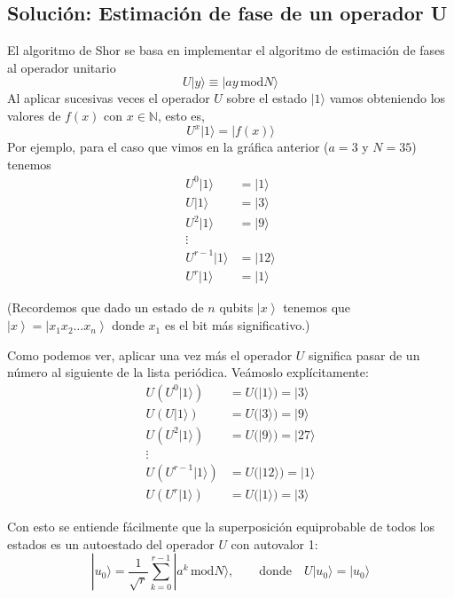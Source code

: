 \documentclass[a4paper,11pt]{book} %
\numberwithin{equation}{chapter}
\begin{document}
\subsection{Solución: Estimación de fase de un operador U}

El algoritmo de Shor se basa en implementar el algoritmo de estimación de fases al operador unitario
	\begin{equation}
	U |y \rangle \equiv | ay \, \text{mod} N \rangle
	\end{equation}
Al aplicar sucesivas veces el operador $U$ sobre el estado $|1 \rangle$ vamos obteniendo los valores de $f(x)$ con $x \in \mathbb{N}$, esto es,
	\begin{equation}
	U^x |1 \rangle = | f(x) \rangle
	\end{equation}
Por ejemplo, para el caso que vimos en la gráfica anterior ($a=3$ y $N=35$) tenemos
\begin{align*}
U^0 |1\rangle & = |1\rangle \\
U |1\rangle & = |3\rangle \\
U^2 |1\rangle & = |9\rangle \\
\vdots \\
U^{r-1} |1\rangle & = |12\rangle \\
U^r |1\rangle & = |1\rangle
\end{align*}

(Recordemos que dado un estado de $n$ qubits $\left| x \right\rangle$ tenemos que $\left| x \right\rangle = \left| x_1 x_2 \dots x_n \right\rangle$ donde $x_1$ es el bit más significativo.)

Como podemos ver, aplicar una vez más el operador $U$ significa pasar de un número al siguiente de la lista periódica. Veámoslo explícitamente:
\begin{align*}
U(U^0 |1\rangle) & = U(|1\rangle) = |3\rangle \\
U(U |1\rangle) & = U(|3\rangle) = |9\rangle \\
U(U^2 |1\rangle) & = U(|9\rangle) = |27\rangle\\
\vdots \\
U(U^{r-1} |1\rangle) & = U(|12\rangle) =|1\rangle \\
U(U^r |1\rangle) & = U(|1\rangle) = |3\rangle
\end{align*}

Con esto se entiende fácilmente que la superposición equiprobable de todos los estados es un autoestado del operador $U$ con autovalor 1:
	\begin{equation}
	| u_0 \rangle = \frac{1}{\sqrt{r}} \sum^{r-1}_{k=0} |a^k \, \text{mod} N \rangle, \qquad \text{donde} \quad U|u_0 \rangle = |u_0\rangle
	\end{equation}
\end{document}
